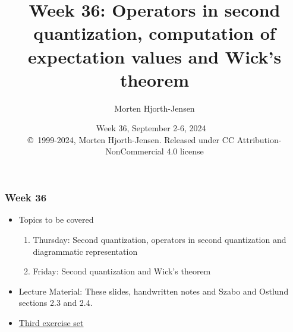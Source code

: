 \documentclass{beamer}
\begin{document}

\newcommand{\exercisesection}[1]{\subsection*{#1}}







\title{Week 36: Operators in second quantization, computation of expectation values and Wick's theorem}


\author{Morten Hjorth-Jensen}

\date{Week 36, September 2-6, 2024
\ \\ 
{\tiny \copyright\ 1999-2024, Morten Hjorth-Jensen. Released under CC Attribution-NonCommercial 4.0 license}
}

\begin{frame}
\titlepage
\end{frame}

\begin{frame}
\frametitle{Week 36}

\begin{itemize}
\item Topics to be covered
\begin{enumerate}

 \item Thursday: Second quantization, operators in second quantization and diagrammatic representation

 \item Friday: Second quantization and Wick's theorem

\end{enumerate}

\noindent
\item Lecture Material: These slides, handwritten notes and	Szabo and Ostlund sections 2.3 and 2.4.

\item \href{{https://github.com/ManyBodyPhysics/FYS4480/blob/master/doc/Exercises/2023/ExercisesWeek36.pdf}}{Third exercise set}
\end{itemize}

\noindent
\end{frame}
\end{document}
